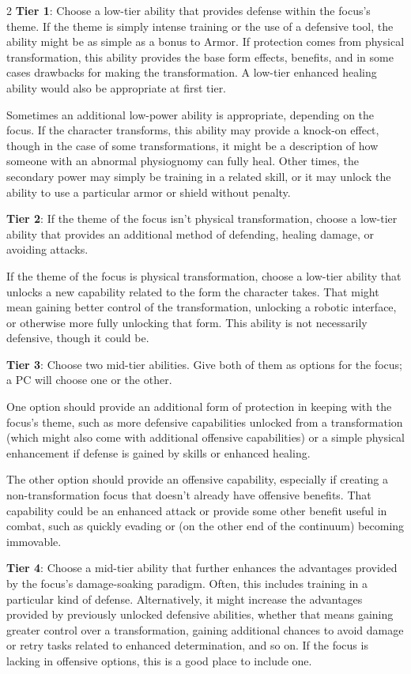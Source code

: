 \begin{multicols}{2}
\textbf{Tier 1}: Choose a low-tier ability that provides defense within the focus’s theme. If the theme is simply intense training or the use of a defensive tool, the ability might be as simple as a bonus to Armor. If protection comes from physical transformation, this ability provides the base form effects, benefits, and in some cases drawbacks for making the transformation. A low-tier enhanced healing ability would also be appropriate at first tier.

Sometimes an additional low-power ability is appropriate, depending on the focus. If the character transforms, this ability may provide a knock-on effect, though in the case of some transformations, it might be a description of how someone with an abnormal physiognomy can fully heal. Other times, the secondary power may simply be training in a related skill, or it may unlock the ability to use a particular armor or shield without penalty.

\textbf{Tier 2}: If the theme of the focus isn’t physical transformation, choose a low-tier ability that provides an additional method of defending, healing damage, or avoiding attacks. 

If the theme of the focus is physical transformation, choose a low-tier ability that unlocks a new capability related to the form the character takes. That might mean gaining better control of the transformation, unlocking a robotic interface, or otherwise more fully unlocking that form. This ability is not necessarily defensive, though it could be.

\textbf{Tier 3}: Choose two mid-tier abilities. Give both of them as options for the focus; a PC will choose one or the other.

One option should provide an additional form of protection in keeping with the focus’s theme, such as more defensive capabilities unlocked from a transformation (which might also come with additional offensive capabilities) or a simple physical enhancement if defense is gained by skills or enhanced healing. 

The other option should provide an offensive capability, especially if creating a non-transformation focus that doesn’t already have offensive benefits. That capability could be an enhanced attack or provide some other benefit useful in combat, such as quickly evading or (on the other end of the continuum) becoming immovable.

\textbf{Tier 4}: Choose a mid-tier ability that further enhances the advantages provided by the focus’s damage-soaking paradigm. Often, this includes training in a particular kind of defense. Alternatively, it might increase the advantages provided by previously unlocked defensive abilities, whether that means gaining greater control over a transformation, gaining additional chances to avoid damage or retry tasks related to enhanced determination, and so on. If the focus is lacking in offensive options, this is a good place to include one.


\end{multicols}
